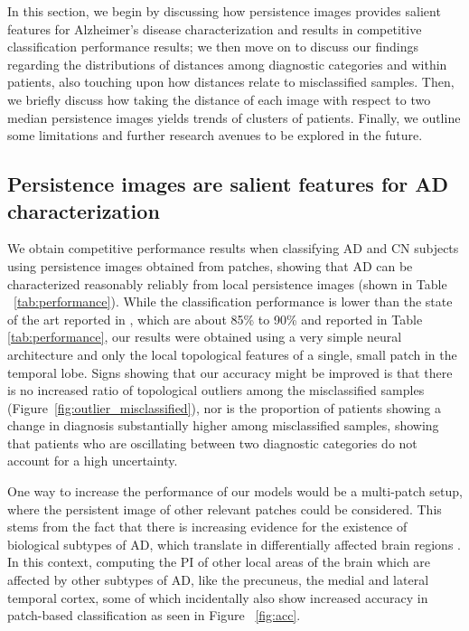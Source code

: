 \documentclass{article}
\begin{document}
In this section, we begin by discussing how persistence images
provides salient features for Alzheimer's disease characterization and results in competitive
classification performance results; we then move on to discuss our findings regarding the
distributions of distances among diagnostic categories and within patients, also touching upon how
distances relate to misclassified samples. Then, we briefly discuss how taking the distance of each
image with respect to two median persistence images yields trends of clusters of patients. Finally,
we outline some limitations and further research avenues to be explored in the future.

\subsection{Persistence images are salient features for AD characterization}

We obtain competitive performance results when classifying AD and CN subjects using persistence
images obtained from patches, showing that AD can be characterized reasonably reliably from local
persistence images (shown in Table ~\ref{tab:performance}). While the classification performance is
lower than the state of the art reported in \citep{liu2018anatomical}, which are about 85\% to 90\%
and reported in Table \ref{tab:performance}, our results were obtained using a very simple neural
architecture and only the local topological features of a single, small patch in the temporal lobe.
Signs showing that our accuracy might be improved is that there is no increased ratio of topological
outliers among the misclassified samples (Figure~\ref{fig:outlier_misclassified}), nor is the
proportion of patients showing a change in diagnosis substantially higher among misclassified
samples, showing that patients who are oscillating between two diagnostic categories do not account
for a high uncertainty.

One way to increase the performance of our models would be a multi-patch setup, where the persistent
image of other relevant patches could be considered. This stems from the fact that there is
increasing evidence for the existence of biological subtypes of AD, which translate in
differentially affected brain regions \citep{poulakis2018heterogeneous, tijms2020pathophysiological}.
In this context, computing the PI of other local areas of the brain which are affected by other
subtypes of AD, like the precuneus, the medial and lateral temporal cortex, some of which
incidentally also show increased accuracy in patch-based classification as seen in Figure
~\ref{fig:acc}.
\end{document}
